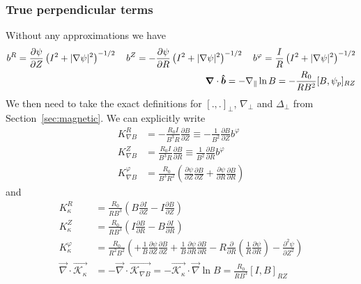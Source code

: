 \subsubsection{True perpendicular terms}
Without any approximations we have
\begin{align}
b^R = {\frac{\partial \psi}{\partial Z}}\left(I^2+|\nabla\psi|^2\right)^{-1/2} \quad
b^Z = -{\frac{\partial \psi}{\partial R}}\left(I^2+|\nabla\psi|^2\right)^{-1/2} \quad 
b^\varphi = \frac{I}{R}\left(I^2+|\nabla\psi|^2\right)^{-1/2} \\
{\boldsymbol{\nabla}}\cdot\bm{\hat{b}} = -\nabla_\parallel \ln B = -\frac{R_0}{R B^2}[B,\psi_p]_{RZ}
\label{}
\end{align}
We then need to take the exact definitions for $[.,.]_\perp$, $\nabla_\perp$ and $\Delta_\perp$ from Section~\ref{sec:magnetic}.
We can explicitly write
\begin{align}
K_{\nabla B}^R &= -\frac{R_0 I}{B^3R}\frac{\partial B}{\partial Z} \equiv -\frac{1}{B^2}\frac{\partial B}{\partial Z}b^\varphi \\
K_{\nabla B}^Z &= \frac{R_0 I}{B^3R}\frac{\partial B}{\partial R}\equiv \frac{1}{B^2}\frac{\partial B}{\partial R}b^\varphi \\
K_{\nabla B}^\varphi &= \frac{R_0}{B^3R^2}\left(
      \frac{\partial \psi}{\partial Z} \frac{\partial B}{\partial Z}
    + \frac{\partial \psi}{\partial R}\frac{\partial B}{\partial R}\right)
\label{}
\end{align}
and
\begin{align}
K_\kappa^R &= \frac{R_0 }{RB^3}\left( B\frac{\partial I}{\partial Z} -I\frac{\partial B}{\partial Z}\right) \\
K_\kappa^Z &= \frac{R_0 }{RB^3} \left( I\frac{\partial B}{\partial R} - B\frac{\partial I}{\partial R} \right)\\
K_\kappa^\varphi &= \frac{R_0}{R^2B^2}\left(
+ \frac{1}{B}\frac{\partial\psi}{\partial Z} \frac{\partial B}{\partial Z}
+ \frac{1}{B}\frac{\partial \psi}{\partial R}\frac{\partial B}{\partial R}
-R\frac{\partial}{\partial R}\left(\frac{1}{R}\frac{\partial\psi}{\partial R}\right) 
- \frac{\partial^2 \psi}{\partial Z^2}
\right) \\
\vec\nabla\cdot\vec{\mathcal K_\kappa} &= -\vec\nabla\cdot\vec{\mathcal K_{\nabla B}}=
    -\vec{\mathcal K_\kappa}\cdot \vec \nabla\ln B = \frac{R_0}{RB^3}[I,B]_{RZ}
\label{}
\end{align}
